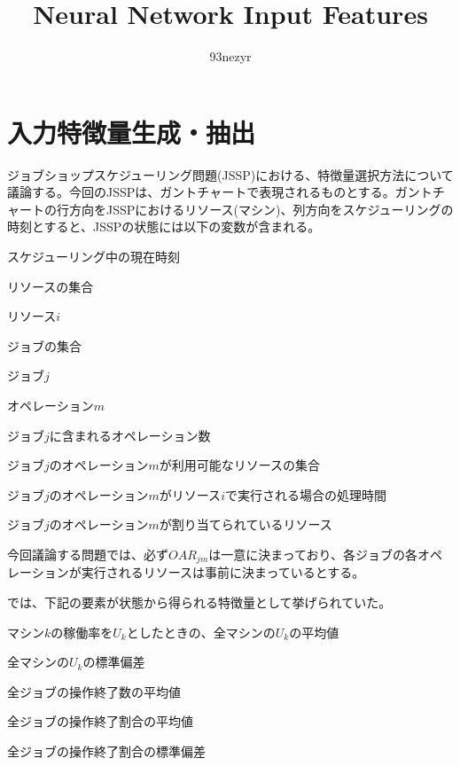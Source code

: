 \documentclass[twocolumn, a4j]{ltjsarticle}
\begin{document}
\title{Neural Network Input Features}
\author{93nezyr}
\maketitle

\section{入力特徴量生成・抽出}

ジョブショップスケジューリング問題(JSSP)における、特徴量選択方法について議論する。今回のJSSPは、ガントチャートで表現されるものとする。ガントチャートの行方向をJSSPにおけるリソース(マシン)、列方向をスケジューリングの時刻とすると、JSSPの状態には以下の変数が含まれる。

\begin{description}[style=multiline, leftmargin=10em]
  \item[$t$] スケジューリング中の現在時刻
  \item[$R$] リソースの集合
  \item[$R_i \in R$] リソース$i$
  \item[$J$] ジョブの集合
  \item[$J_j \in J$] ジョブ$j$
  \item[$O_m$] オペレーション$m$
  \item[$ON_{j}$] ジョブ$j$に含まれるオペレーション数
  \item[$OAR_{jm} = \{r \in R\}$] ジョブ$j$のオペレーション$m$が利用可能なリソースの集合
  \item[$PT_{ijm}$] ジョブ$j$のオペレーション$m$がリソース$i$で実行される場合の処理時間
  \item[$OR_{jm} \in R$] ジョブ$j$のオペレーション$m$が割り当てられているリソース
\end{description}

今回議論する問題では、必ず$OAR_{jm}$は一意に決まっており、各ジョブの各オペレーションが実行されるリソースは事前に決まっているとする。

\cite{shuluo2020}では、下記の要素が状態から得られる特徴量として挙げられていた。

\begin{description}[style=multiline, leftmargin=10em]
  \item[$U_{ave}$] マシン$k$の稼働率を$U_k$としたときの、全マシンの$U_k$の平均値
  \item[$U_{std}$] 全マシンの$U_k$の標準偏差
  \item[$CRO_{ave}$] 全ジョブの操作終了数の平均値
  \item[$CRJ_{ave}$] 全ジョブの操作終了割合の平均値
  \item[$CRJ_{std}$] 全ジョブの操作終了割合の標準偏差
\end{description}
\end{document}
